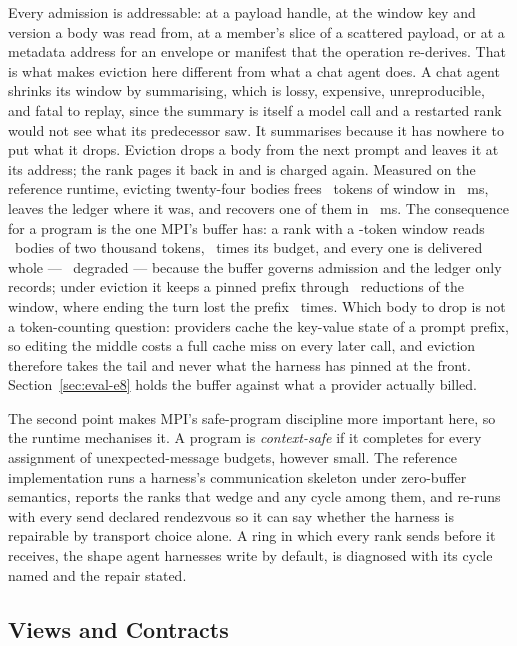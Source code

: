 \documentclass[sigconf,nonacm]{acmart}
\begin{document}
Every admission is addressable: at a payload handle, at the window key and
version a body was read from, at a member's slice of a scattered payload, or at
a metadata address for an envelope or manifest that the operation re-derives.
That is what makes eviction here different from what a chat agent does. A chat
agent shrinks its window by summarising, which is lossy, expensive,
unreproducible, and fatal to replay, since the summary is itself a model call
and a restarted rank would not see what its predecessor saw. It summarises
because it has nowhere to put what it drops. Eviction drops a body from the next
prompt and leaves it at its address; the rank pages it back in and is charged
again. Measured on the reference runtime, evicting twenty-four bodies frees
\evictFreed\ tokens of window in \evictMs\ ms, leaves the ledger where it was,
and recovers one of them in \evictRecoverMs\ ms. The consequence for a program
is the one MPI's buffer has: a rank with a \gateBudget-token window reads
\gateBodies\ bodies of two thousand tokens, \gateLedgerX\ times its budget, and
every one is delivered whole --- \gateDegraded\ degraded --- because the buffer
governs admission and the ledger only records; under eviction it keeps a pinned
prefix through \gateReductions\ reductions of the window, where ending the turn
lost the prefix \gateReleaseReductions\ times. Which body to drop is not a
token-counting question: providers cache the key-value state of a prompt
prefix, so editing the middle costs a full cache miss on every later call, and
eviction therefore takes the tail and never what the harness has pinned at the
front. Section~\ref{sec:eval-e8} holds the buffer against what a provider
actually billed.

The second point makes MPI's safe-program discipline more important here, so the
runtime mechanises it. A program is \emph{context-safe} if it completes for every
assignment of unexpected-message budgets, however small. The reference
implementation runs a harness's communication skeleton under zero-buffer
semantics, reports the ranks that wedge and any cycle among them, and re-runs
with every send declared rendezvous so it can say whether the harness is
repairable by transport choice alone. A ring in which every rank sends before it
receives, the shape agent harnesses write by default, is diagnosed with its
cycle named and the repair stated.

\subsection{Views and Contracts}
\label{sec:views}
\end{document}
